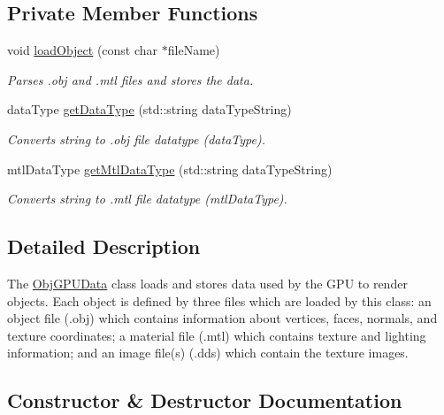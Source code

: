 \subsection*{Private Member Functions}
\begin{DoxyCompactItemize}
\item 
void \hyperlink{class_obj_g_p_u_data_a1c858f6126d5973bdeb6a0134fb81143}{load\+Object} (const char $\ast$file\+Name)
\begin{DoxyCompactList}\small\item\em Parses .obj and .mtl files and stores the data. \end{DoxyCompactList}\item 
data\+Type \hyperlink{class_obj_g_p_u_data_a5142d67710fd69c85813a30e0b880b26}{get\+Data\+Type} (std\+::string data\+Type\+String)
\begin{DoxyCompactList}\small\item\em Converts string to .obj file datatype (data\+Type). \end{DoxyCompactList}\item 
mtl\+Data\+Type \hyperlink{class_obj_g_p_u_data_a152113d684710b097257ba3ed1d08acf}{get\+Mtl\+Data\+Type} (std\+::string data\+Type\+String)
\begin{DoxyCompactList}\small\item\em Converts string to .mtl file datatype (mtl\+Data\+Type). \end{DoxyCompactList}\end{DoxyCompactItemize}


\subsection{Detailed Description}
The \hyperlink{class_obj_g_p_u_data}{Obj\+G\+P\+U\+Data} class loads and stores data used by the G\+PU to render objects. Each object is defined by three files which are loaded by this class\+: an object file (.obj) which contains information about vertices, faces, normals, and texture coordinates; a material file (.mtl) which contains texture and lighting information; and an image file(s) (.dds) which contain the texture images. 

\subsection{Constructor \& Destructor Documentation}

